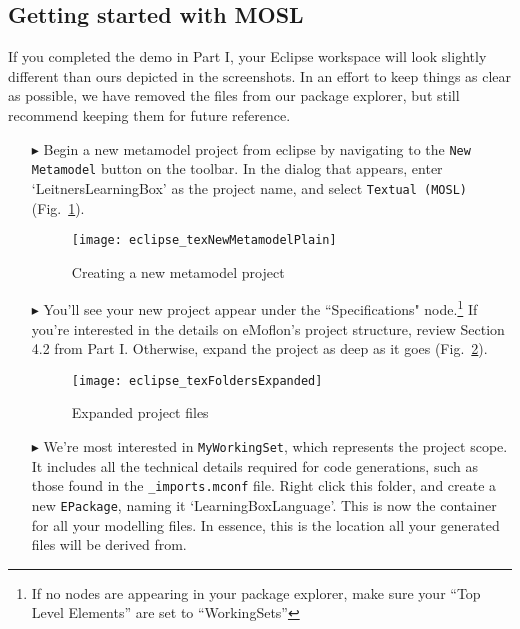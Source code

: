 \clearpage
\subsection{Getting started with MOSL}
\texHeader
\hypertarget{static:starting tex}{}

\hypertarget{static tex}{} 

{\footnotesize If you completed the demo in Part I, your Eclipse workspace will look slightly different than ours depicted in the screenshots. In an effort to
keep things as clear as possible, we have removed the files from our package explorer, but still recommend keeping them for future reference.}

\begin{itemize}
\item[$\blacktriangleright$] Begin a new metamodel project from eclipse by navigating to the \texttt{New Metamodel} button on the toolbar. In the dialog that
appears, enter `LeitnersLearningBox' as the project name, and select \texttt{Textual (MOSL)}  (Fig.~\ref{fig:new_project}).

\vspace{0.5cm}

\begin{figure}[htbp]
	\centering
  \texttt{[image: eclipse\_texNewMetamodelPlain]}
	\caption{Creating a new metamodel project}
	\label{fig:new_project}
\end{figure}

\vspace{0.5cm}

\item[$\blacktriangleright$] You'll see your new project appear under the ``Specifications" node.\footnote{If no nodes are appearing in your package explorer,
make sure your ``Top Level Elements'' are set to ``WorkingSets''} If you're interested in the details on eMoflon's project structure, review Section 4.2 from
Part I. Otherwise, expand the project as deep as it goes (Fig.~\ref{fig:expanded_folders}).

\clearpage

\begin{figure}[htbp]
	\centering
  \texttt{[image: eclipse\_texFoldersExpanded]}
	\caption{Expanded project files}
	\label{fig:expanded_folders}
\end{figure} 

\vspace{0.25cm}

\item[$\blacktriangleright$] We're most interested in \texttt{MyWorkingSet}, which represents the project scope. It includes all the technical details required
for code generations, such as those found in the \texttt{\_imports.mconf} file. Right click this folder, and create a new \texttt{EPackage}, naming it
`LearningBoxLanguage'. This is now the container for all your modelling files. In essence, this is the location all your generated files will be derived from.


\end{itemize}
